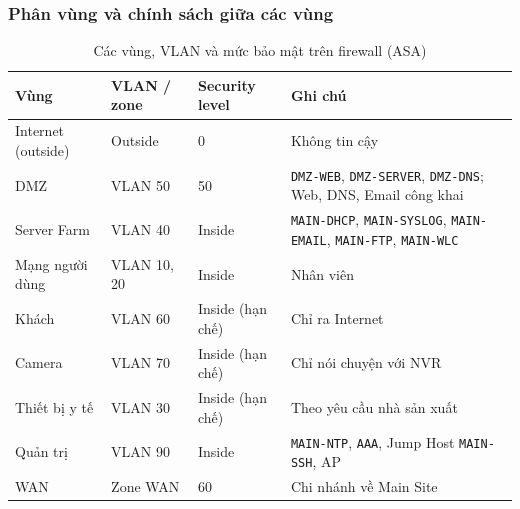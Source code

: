 \subsubsection{Phân vùng và chính sách giữa các vùng}
\begin{small}
\setlength{\tabcolsep}{4pt}
\begin{longtable}{|p{2.9cm}|p{2.3cm}|p{3.0cm}|p{5.6cm}|}
\caption{Các vùng, VLAN và mức bảo mật trên firewall (ASA)} \label{tab:partitions} \\
\hline
\textbf{Vùng} & \textbf{VLAN / zone} & \textbf{Security level} & \textbf{Ghi chú} \\ \hline
\endhead
Internet (outside) & Outside & 0 & Không tin cậy \\ \hline
DMZ & VLAN 50 & 50 & \texttt{DMZ-WEB}, \texttt{DMZ-SERVER}, \texttt{DMZ-DNS}; Web, DNS, Email công khai \\ \hline
Server Farm & VLAN 40 & Inside & \texttt{MAIN-DHCP}, \texttt{MAIN-SYSLOG}, \texttt{MAIN-EMAIL}, \texttt{MAIN-FTP}, \texttt{MAIN-WLC} \\ \hline
Mạng người dùng & VLAN 10, 20 & Inside & Nhân viên \\ \hline
Khách & VLAN 60 & Inside (hạn chế) & Chỉ ra Internet \\ \hline
Camera & VLAN 70 & Inside (hạn chế) & Chỉ nói chuyện với NVR \\ \hline
Thiết bị y tế & VLAN 30 & Inside (hạn chế) & Theo yêu cầu nhà sản xuất \\ \hline
Quản trị & VLAN 90 & Inside & \texttt{MAIN-NTP}, \texttt{AAA}, Jump Host \texttt{MAIN-SSH}, AP \\ \hline
WAN & Zone WAN & 60 & Chi nhánh về Main Site \\ \hline
\end{longtable}
\end{small}

